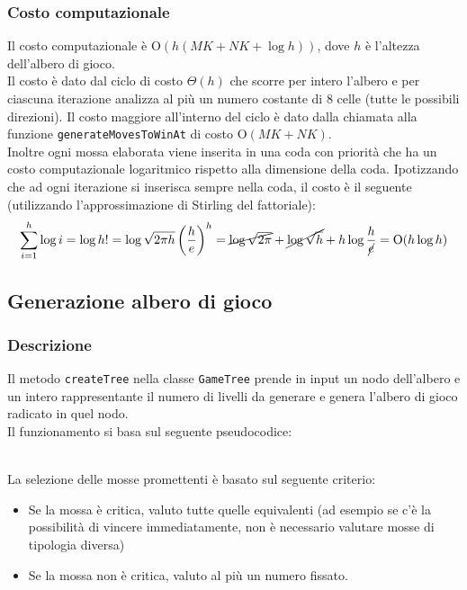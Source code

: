 \documentclass[11pt]{article}
\begin{document}
\subsubsection*{Costo computazionale}
Il costo computazionale è O$(h(MK+NK+\log h))$, dove $h$ è l'altezza dell'albero di gioco.\\
Il costo è dato dal ciclo di costo $\Theta(h)$ che scorre per intero l'albero e per ciascuna iterazione analizza al più un numero costante di 8 celle (tutte le possibili direzioni). Il costo maggiore all'interno del ciclo è dato dalla chiamata alla funzione \texttt{generateMovesToWinAt} di costo O$(MK+NK)$.\\
Inoltre ogni mossa elaborata viene inserita in una coda con priorità che ha un costo computazionale logaritmico rispetto alla dimensione della coda. Ipotizzando che ad ogni iterazione si inserisca sempre nella coda, il costo è il seguente (utilizzando l'approssimazione di Stirling del fattoriale):
\begin{align*}
\sum_{i=1}^{h} \log i = \log h! = \log \sqrt{2\pi h} \left(\dfrac{h}{e}\right)^h = \cancel{\log \sqrt{2 \pi}} + \cancel{\log \sqrt{h}} + h \log \dfrac{h}{\cancel{e}} = \text{O}(h \log h)
\end{align*}

\subsection*{Generazione albero di gioco}
\subsubsection*{Descrizione}
Il metodo \texttt{createTree} nella classe \texttt{GameTree} prende in input un nodo dell'albero e un intero rappresentante il numero di livelli da generare e genera l'albero di gioco radicato in quel nodo.\\
Il funzionamento si basa sul seguente pseudocodice:
\begin{algorithm*}
\SetAlgoLined
{}
\end{algorithm*}\\
La selezione delle mosse promettenti è basato sul seguente criterio:
\begin{itemize}
\setlength\itemsep{0.05cm}
	\item Se la mossa è critica, valuto tutte quelle equivalenti (ad esempio se c'è la possibilità di vincere immediatamente, non è necessario valutare mosse di tipologia diversa)
	\item Se la mossa non è critica, valuto al più un numero fissato.
\end{itemize}
\end{document}
